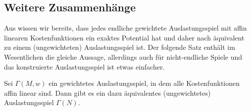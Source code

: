 \subsection{Weitere Zusammenhänge}


Aus  wissen wir bereits, dass jedes endliche gewichtete Auslastungsspiel mit affin linearen Kostenfunktionen ein exaktes Potential hat und daher nach  äquivalent zu einem (ungewichteten) Auslastungsspiel ist. Der folgende Satz enthält im Wesentlichen die gleiche Aussage, allerdings auch für nicht-endliche Spiele und das konstruierte Auslastungsspiel ist etwas einfacher.

\begin{satz}
	Sei $\Gamma(M,w)$ ein gewichtetes Auslastungsspiel, in dem alle Kostenfunktionen affin linear sind. Dann gibt es ein dazu äquivalentes (ungewichtetes) Auslastungsspiel $\Gamma(N)$. 
\end{satz}

